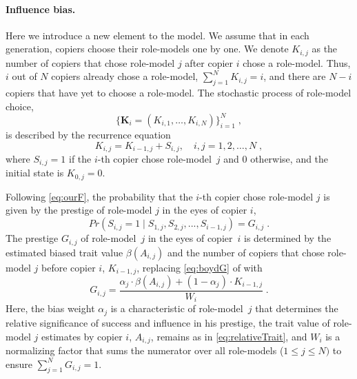 \documentclass[12pt]{extarticle}
\let\vec\mathbf
\begin{document}
\paragraph{Influence bias.}
Here we introduce a new element to the model.
We assume that in each generation, copiers choose their role-models one by one.
We denote $K_{i,j}$ as the number of copiers that chose role-model $j$ after copier $i$ chose a role-model. Thus, $i$ out of $N$ copiers already chose a role-model, $\sum_{j=1}^N{K_{i,j}} = i$, and there are $N-i$ copiers that have yet to choose a role-model.
The stochastic process of role-model choice, 
\begin{equation} \label{eq:process}
\big\{\vec{K}_i = (K_{i,1}, \ldots, K_{i,N}) \big\}_{i=1}^N \;,
\end{equation}
is described by the recurrence equation
\begin{equation} \label{eq:recurrence}
K_{i,j} = K_{i-1,j} + S_{i,j}, \quad i,j=1,2,\ldots,N \;,
\end{equation}
where $S_{i,j}=1$ if the $i$-th copier chose role-model~$j$ and 0 otherwise, and the initial state is $K_{0,j}=0$.

Following \cref{eq:ourF}, the probability that the $i$-th copier chose role-model $j$ is given by the prestige of role-model $j$ in the eyes of copier $i$,
\begin{equation}\label{eq:recPrestige}
Pr(S_{i,j}=1 \mid S_{1,j},S_{2,j},...,S_{i-1,j}) = G_{i,j} \;.
\end{equation}
The prestige $G_{i,j}$ of role-model~$j$ in the eyes of copier~$i$ is determined by the estimated biased trait value $\beta(A_{i,j})$ and the number of copiers that chose role-model $j$ before copier $i$, $K_{i-1,j}$, replacing \cref{eq:boydG} of \citet{evolutionBook} with
\begin{equation}\label{eq:prestige}
G_{i,j} = \frac{\alpha_j \cdot \beta(A_{i,j}) + (1-\alpha_j) \cdot K_{i-1,j}}{W_i} \;.
\end{equation}
Here, the bias weight $\alpha_j$ is a characteristic of role-model~$j$ that determines the relative significance of success and influence in his prestige, the trait value of role-model $j$ estimates by copier $i$, $A_{i,j}$, remains as in \cref{eq:relativeTrait}, and $W_i$ is a normalizing factor that sums the numerator over all role-models ($1\le j \le N)$ to ensure $\sum_{j=1}^{N}{G_{i,j}}=1$.
\end{document}
